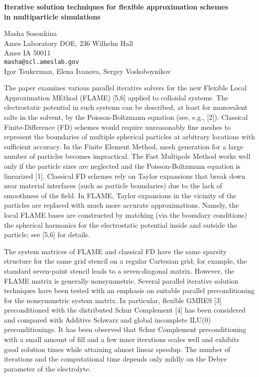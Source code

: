 \documentclass[twosided]{report}
\begin{document}
\begin{center}
{\large			%
{\bf Iterative solution techniques for flexible approximation schemes \\
	in multiparticle simulations}}

	Masha Sosonkina \\
	Ames Laboratory DOE, 236 Wilhelm Hall \\
	Ames IA 50011 \\
	{\tt masha@scl.ameslab.gov} \\
	Igor Tsukerman, Elena Ivanova, Sergey Voskoboynikov
\end{center}
The paper examines various parallel iterative solvers
for the new Flexible Local Approximation MEthod (FLAME)
[5,6] applied to colloidal
systems. The electrostatic potential in such  systems
can be described, at least for monovalent salts in the
solvent, by the Poisson-Boltzmann equation
(see, e.g., [2]).
Classical Finite-Difference (FD)
schemes would require unreasonably fine meshes to
represent the boundaries of multiple spherical
particles at arbitrary locations with sufficient
accuracy. In the Finite Element Method, mesh generation
for a large number of particles becomes impractical.
The Fast Multipole Method works well only if the
particle sizes are neglected and the Poisson-Boltzmann
equation is linearized [1].  Classical
FD schemes rely on Taylor expansions that break down
near material interfaces (such as particle boundaries)
due to the lack of smoothness  of the field. In FLAME,
Taylor expansions in the vicinity of the particles  are
replaced with much more accurate approximations.
Namely, the local FLAME bases are constructed by
matching (via the boundary conditions) the spherical
harmonics for the electrostatic potential inside and
outside the particle;
see [5,6] for details.

The system matrices of FLAME and classical FD have the
same sparsity structure for the same grid stencil on a
regular Cartesian grid; for example, the standard
seven-point stencil leads to a seven-diagonal matrix.
However, the FLAME matrix is generally nonsymmetric.
Several parallel iterative solution techniques have
been tested with an emphasis on suitable parallel
preconditioning for the nonsymmetric system matrix. In
particular, flexible GMRES [3]
preconditioned with the distributed Schur Complement
[4] has been considered and
compared with Additive Schwarz and global incomplete
ILU(0) preconditionings.  It has been observed that
Schur Complement preconditioning with a small amount of
fill and a few inner iterations scales well and
exhibits good solution times while attaining almost
linear speedup. The number of iterations and the
computational time depends only mildly on the Debye
parameter of the electrolyte.
\end{document}
